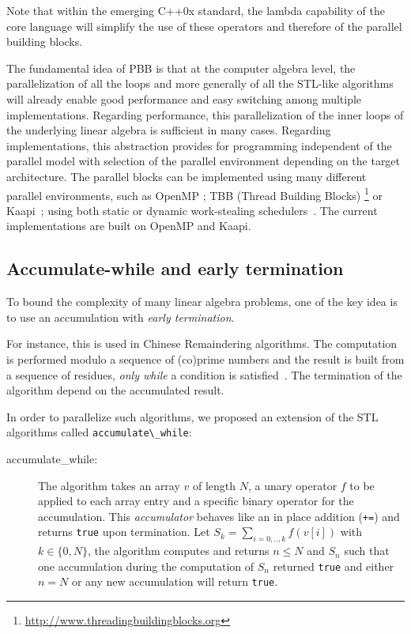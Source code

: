 \documentclass[runningheads,a4paper]{llncs}
\begin{document}
  Note that within the emerging C++0x standard, the lambda capability
  of the core language will simplify the use of these operators and
  therefore of the parallel building blocks.

  
  The fundamental idea of PBB is that at the computer algebra
  level, the parallelization of all the loops and more generally of all
  the STL-like algorithms will already enable good performance and easy switching among multiple implementations.
Regarding performance, this parallelization of the inner loops of
the underlying linear algebra is sufficient in many cases.
Regarding implementations, this
abstraction provides for programming independent of the
parallel model with selection of the parallel environment
depending on the target architecture.
The parallel blocks can be implemented using many different parallel
environments, such as OpenMP
\cite{Chapman:2007:openmp}; TBB (Thread Building Blocks)
  \footnote{\url{http://www.threadingbuildingblocks.org}} or
  Kaapi~\cite{inproceedingsgautier.gbp_ktsrsf_07}; using
  both static or dynamic work-stealing
  schedulers~\cite{con-traore.trmgb_08}.
The current implementations are built on OpenMP and Kaapi.

\subsection{Accumulate-while and early termination}
To bound the complexity of many linear algebra problems, one of the
key idea is to use an accumulation with {\em early termination}.

For instance, this is used in Chinese Remaindering algorithms. The
computation is performed modulo a sequence of (co)prime numbers and
the result is built from a sequence of residues, {\em only while} a
condition is satisfied~\cite{jgd:2010:crt}. 
The termination of the algorithm depend on the accumulated 
result.
  
In order to parallelize such algorithms, we proposed an extension of
the STL algorithms called \verb+accumulate\_while+:
\begin{description} 
\item [accumulate\_while:] The algorithm takes an array $v$ of length $N$, a unary
  operator $f$ to be applied to each array entry and a specific binary
  operator for the accumulation.
  This {\em accumulator} behaves like an in place addition (\verb!+=!) and
  returns \texttt{true} upon termination.
  Let $S_k = \sum_{i=0,..,k} f( v[i])$ with 
  $k \in \{0,N\}$, the algorithm computes and returns $n \leq N$ and
  $S_n$ such that one accumulation during the computation of $S_n$
  returned \texttt{true} and either $n = N$ or any new accumulation
  will return \texttt{true}.
\end{description} 
\end{document}

